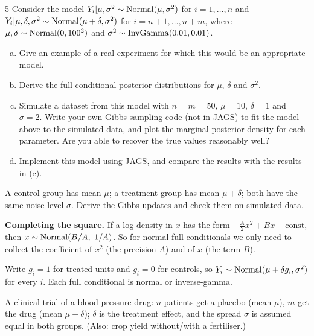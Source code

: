 \documentclass[11pt]{article}
\begin{document}
\begin{problem}{5}
Consider the model $Y_i|\mu,\sigma^2\sim\mathrm{Normal}(\mu,\sigma^2)$ for $i=1,\dots,n$ and $Y_i|\mu,\delta,\sigma^2\sim\mathrm{Normal}(\mu+\delta,\sigma^2)$ for $i=n+1,\dots,n+m$, where $\mu,\delta\sim\mathrm{Normal}(0,100^2)$ and $\sigma^2\sim\mathrm{InvGamma}(0.01,0.01)$.
\begin{enumerate}[(a)]
\item Give an example of a real experiment for which this would be an appropriate model.
\item Derive the full conditional posterior distributions for $\mu$, $\delta$ and $\sigma^2$.
\item Simulate a dataset from this model with $n=m=50$, $\mu=10$, $\delta=1$ and $\sigma=2$. Write your own Gibbs sampling code (not in JAGS) to fit the model above to the simulated data, and plot the marginal posterior density for each parameter. Are you able to recover the true values reasonably well?
\item Implement this model using JAGS, and compare the results with the results in (c).
\end{enumerate}
\end{problem}

\begin{restate}
A control group has mean $\mu$; a treatment group has mean $\mu+\delta$; both have the same noise level $\sigma$. Derive the Gibbs updates and check them on simulated data.
\end{restate}

\begin{recall}
\textbf{Completing the square.} If a log density in $x$ has the form $-\frac{A}{2}x^2+Bx+\text{const}$, then $x\sim\mathrm{Normal}(B/A,\ 1/A)$. So for normal full conditionals we only need to collect the coefficient of $x^2$ (the precision $A$) and of $x$ (the term $B$).
\end{recall}

\begin{keyidea}
Write $g_i=1$ for treated units and $g_i=0$ for controls, so $Y_i\sim\mathrm{Normal}(\mu+\delta g_i,\sigma^2)$ for every $i$. Each full conditional is normal or inverse-gamma.
\end{keyidea}

\solution
{} A clinical trial of a blood-pressure drug: $n$ patients get a placebo (mean $\mu$), $m$ get the drug (mean $\mu+\delta$); $\delta$ is the treatment effect, and the spread $\sigma$ is assumed equal in both groups. (Also: crop yield without/with a fertiliser.)
\end{document}
